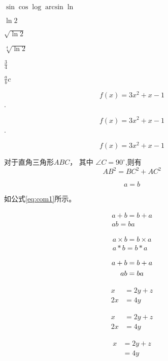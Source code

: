 \documentclass[12pt]{article} %
\newcommand{\degree}{^\circ}
\begin{document}
	$\sin \cos \log \arcsin \ln$
	
	$\ln 2$
	
	$\sqrt{\ln 2}$
	
	$\sqrt[4]{\ln 2}$
	
	$\frac{3}{4}$
	
	$\frac abc$
	
	$$f(x)=3x^2+x-1$$.
	
	\[f(x)=3x^2+x-1\].
	
	\begin{displaymath}
		f(x)=3x^2+x-1
	\end{displaymath}
	
	对于直角三角形$ABC$， 其中 $\angle C=90\degree$,则有
	\begin{equation}
	AB^2 = BC^2 + AC^2	\label{eq:com1}
	\end{equation}
	
	\begin{equation*}	%
		a=b	\label{eq:com2}
	\end{equation*}
	
	
	如公式\ref{eq:com1}所示。
	
	\begin{gather}
		a+b=b+a\\
		ab=ba
	\end{gather}
	
	\begin{gather*}
		a\times b=b \times a\\
		a*b=b*a
	\end{gather*}
	
	\begin{gather}
		a+b=b+a \notag \\	%
		ab=ba
	\end{gather}
	
	\begin{align}	%
		x &= 2y+z	\\
		2x &= 4y
	\end{align}
	
	\begin{align*}
		x &= 2y+z	\\
		2x &= 4y
	\end{align*}
	
	\begin{equation}
		\begin{split}	%
			x &= 2y+z	\\
			&= 4y
		\end{split}
	\end{equation}
	
\end{document}
